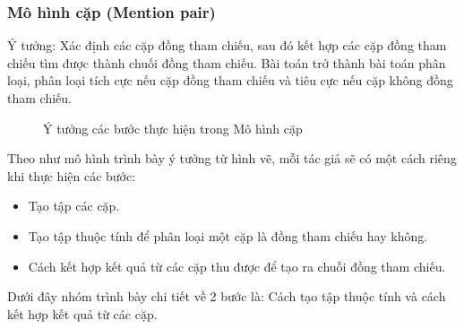\documentclass[12pt]{extarticle}
\begin{document}
			\subsubsection*{Mô hình cặp (Mention pair)}
				\par Ý tưởng:  Xác định các cặp đồng tham chiếu, sau đó kết hợp các cặp đồng tham chiếu tìm được thành chuối đồng tham chiếu. Bài toán trở thành bài toán phân loại, phân loại tích cực nếu cặp đồng tham chiếu và tiêu cực nếu cặp không đồng tham chiếu.
				\begin{figure}[H]
					\centering
					
					\caption{Ý tưởng các bước thực hiện trong Mô hình cặp}
				\end{figure}
				\par Theo như mô hình trình bày ý tưởng từ hình vẽ, mỗi tác giả sẽ có một cách riêng khi thực hiện các bước:
				\begin{itemize}
					\item{Tạo tập các cặp.}
					\item{Tạo tập thuộc  tính để phân loại một cặp là đồng tham chiếu hay không.}
					\item{Cách kết hợp kết quả từ các cặp thu được để tạo ra chuỗi đồng tham chiếu.}
				\end{itemize}
				\par Dưới đây nhóm trình bày chi tiết về 2 bước là: Cách tạo tập thuộc tính và cách kết hợp kết quả từ các cặp.
\end{document}
